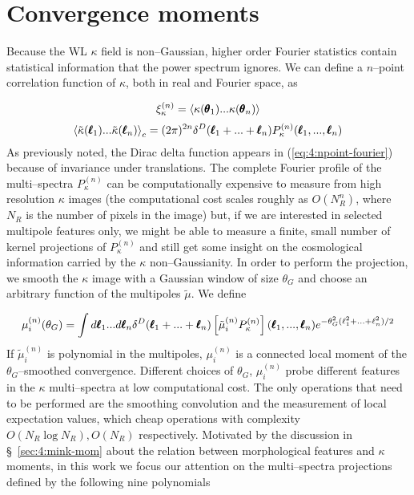 
\section{Convergence moments}
\label{sec:4:moments}
Because the WL $\kappa$ field is non--Gaussian, higher order Fourier statistics contain statistical information that the power spectrum ignores. We can define a $n$--point correlation function of $\kappa$, both in real and Fourier space, as

\begin{equation}
\label{eq:4:npoint-real}
\xi^{(n)}_\kappa = \left\langle\kappa(\pmb{\theta}_1)...\kappa(\pmb{\theta}_n)\right\rangle
\end{equation}
%
\begin{equation}
\label{eq:4:npoint-fourier}
\left\langle\tilde{\kappa}(\pmb{\ell}_1)...\tilde{\kappa}(\pmb{\ell}_n)\right\rangle_c = (2\pi)^{2n} \delta^D(\pmb{\ell}_1+...+\pmb{\ell}_n)P_\kappa^{(n)}(\pmb{\ell}_1,...,\pmb{\ell}_n)
\end{equation}
%
As previously noted, the Dirac delta function appears in (\ref{eq:4:npoint-fourier}) because of invariance under translations. The complete Fourier profile of the multi--spectra $P^{(n)}_\kappa$ can be computationally expensive to measure from high resolution $\kappa$ images (the computational cost scales roughly as $O(N_R^n)$, where $N_R$ is the number of pixels in the image) but, if we are interested in selected multipole features only, we might be able to measure a finite, small number of kernel projections of $P^{(n)}_\kappa$ and still get some insight on the cosmological information carried by the $\kappa$ non--Gaussianity. In order to perform the projection, we smooth the $\kappa$ image with a Gaussian window of size $\theta_G$ and choose an arbitrary function of the multipoles $\tilde{\mu}$. We define

\begin{equation}
\label{eq:4:npoint-projection}
\mu^{(n)}_i(\theta_G) = \int d\pmb{\ell}_1...d\pmb{\ell}_n \delta^D(\pmb{\ell}_1+...+\pmb{\ell}_n)\left[\tilde{\mu}^{(n)}_iP_\kappa^{(n)}\right](\pmb{\ell}_1,...,\pmb{\ell}_n)e^{-\theta_G^2(\ell_1^2+...+\ell_n^2)/2}
\end{equation}
%
If $\tilde{\mu}^{(n)}_i$ is polynomial in the multipoles, $\mu^{(n)}_i$ is a connected local moment of the $\theta_G$--smoothed convergence. Different choices of $\theta_G$, $\mu^{(n)}_i$ probe different features in the $\kappa$ multi--spectra at low computational cost. The only operations that need to be performed are the smoothing convolution and the measurement of local expectation values, which cheap operations with complexity $O(N_R\log N_R), O(N_R)$ respectively. Motivated by the discussion in \S~\ref{sec:4:mink-mom} about the relation between morphological features and $\kappa$ moments, in this work we focus our attention on the multi--spectra projections defined by the following nine polynomials

